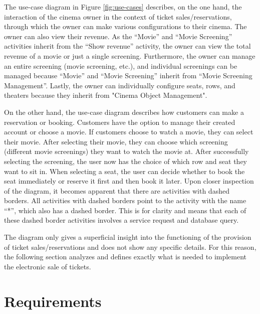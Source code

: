 The use-case diagram in Figure \ref{fig:use-cases} describes, on the one hand, the interaction of the cinema owner in the context of ticket sales/reservations, through which the owner can make various configurations to their cinema. The owner can also view their revenue. As the \enquote{Movie} and \enquote{Movie Screening} activities inherit from the \enquote{Show revenue} activity, the owner can view the total revenue of a movie or just a single screening. Furthermore, the owner can manage an entire screening (movie screening, etc.), and individual screenings can be managed because \enquote{Movie} and \enquote{Movie Screening} inherit from \enquote{Movie Screening Management}. Lastly, the owner can individually configure seats, rows, and theaters because they inherit from "Cinema Object Management".

On the other hand, the use-case diagram describes how customers can make a reservation or booking. Customers have the option to manage their created account or choose a movie. If customers choose to watch a movie, they can select their movie. After selecting their movie, they can choose which screening (different movie screenings) they want to watch the movie at. After successfully selecting the screening, the user now has the choice of which row and seat they want to sit in. When selecting a seat, the user can decide whether to book the seat immediately or reserve it first and then book it later. Upon closer inspection of the diagram, it becomes apparent that there are activities with dashed borders. All activities with dashed borders point to the activity with the name \enquote{*}, which also has a dashed border. This is for clarity and means that each of these dashed border activities involves a service request and database query.

The diagram only gives a superficial insight into the functioning of the provision of ticket sales/reservations and does not show any specific details. For this reason, the following section analyzes and defines exactly what is needed to implement the electronic sale of tickets.


\pagebreak

\section{Requirements}
\label{sec:requirements}

